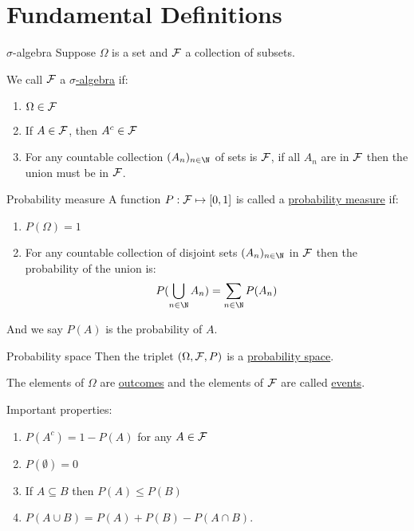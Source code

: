 \documentclass[../Main.tex]{subfiles}
\begin{document}
\section{Fundamental Definitions}
\begin{definition}{$\sigma$-algebra}
    Suppose $\Omega$ is a set and $\mathcal{F}$ a collection of subsets.\par
    We call $\mathcal{F}$ a \underline{$\sigma$-algebra} if:
    \begin{enumerate}
        \item $\Omega \in \mathcal{F}$
        \item If $A \in \mathcal{F}$, then $A^c \in \mathcal{F}$ %
        \item For any countable collection $(A_n)_{n \in \N}$ of sets is $\mathcal{F}$, if all $A_n$ are in $\mathcal{F}$ then the union must be in $\mathcal{F}$.
    \end{enumerate}
\end{definition}
\begin{definition}{Probability measure}
    A function $P : \mathcal{F} \mapsto [0, 1]$ is called a \underline{probability measure} if:
    \begin{enumerate}
        \item $P(\Omega) = 1$
        \item For any countable collection of disjoint sets $(A_n)_{n \in \N}$ in $\mathcal{F}$ then the probability of the union is:
            \begin{equation*}
                P(\bigcup_{n \in \N} A_n) = \sum_{n \in \N} P(A_n)
            \end{equation*}
    \end{enumerate}
    And we say $P(A)$ is the probability of $A$.
\end{definition}
\begin{definition}{Probability space}
    Then the triplet $(\Omega, \mathcal{F}, P)$ is a \underline{probability space}.\par
    The elements of $\Omega$ are \underline{outcomes} and the elements of $\mathcal{F}$ are called \underline{events}.
\end{definition}
Important properties:
\begin{enumerate}
    \item $P(A^c) = 1 -P(A)$ for any $A \in \mathcal{F}$
    \item $P(\emptyset) = 0$
    \item If $A \subseteq B$ then $P(A) \leq P(B)$
    \item $P(A \cup B) = P(A) + P(B) - P(A \cap B)$.
\end{enumerate}
\end{document}
